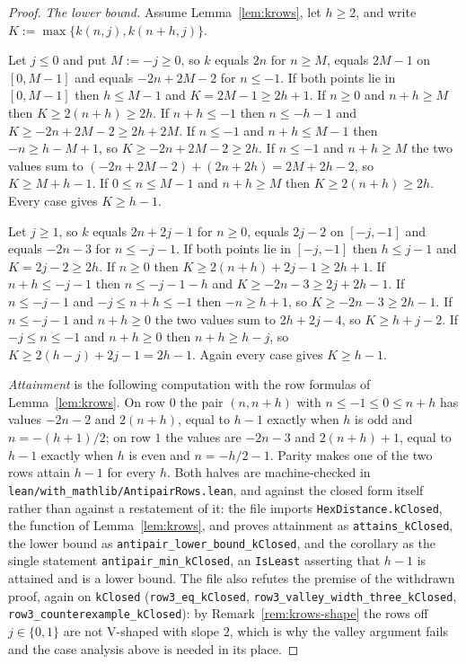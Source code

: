 \documentclass[11pt]{article}
\theoremstyle{definition}
\theoremstyle{remark}
\begin{document}
\begin{proof}
\emph{The lower bound.} Assume Lemma~\ref{lem:krows}, let $h\ge2$, and write
$K:=\max\{k(n,j),k(n+h,j)\}$.

Let $j\le0$ and put $M:=-j\ge0$, so $k$ equals $2n$ for $n\ge M$, equals $2M-1$ on $[0,M-1]$
and equals $-2n+2M-2$ for $n\le-1$. If both points lie in $[0,M-1]$ then $h\le M-1$ and
$K=2M-1\ge2h+1$. If $n\ge0$ and $n+h\ge M$ then $K\ge2(n+h)\ge2h$. If $n+h\le-1$ then
$n\le-h-1$ and $K\ge-2n+2M-2\ge2h+2M$. If $n\le-1$ and $n+h\le M-1$ then $-n\ge h-M+1$, so
$K\ge-2n+2M-2\ge2h$. If $n\le-1$ and $n+h\ge M$ the two values sum to
$(-2n+2M-2)+(2n+2h)=2M+2h-2$, so $K\ge M+h-1$. If $0\le n\le M-1$ and $n+h\ge M$ then
$K\ge2(n+h)\ge2h$. Every case gives $K\ge h-1$.

Let $j\ge1$, so $k$ equals $2n+2j-1$ for $n\ge0$, equals $2j-2$ on $[-j,-1]$ and equals
$-2n-3$ for $n\le-j-1$. If both points lie in $[-j,-1]$ then $h\le j-1$ and $K=2j-2\ge2h$. If
$n\ge0$ then $K\ge2(n+h)+2j-1\ge2h+1$. If $n+h\le-j-1$ then $n\le-j-1-h$ and
$K\ge-2n-3\ge2j+2h-1$. If $n\le-j-1$ and $-j\le n+h\le-1$ then $-n\ge h+1$, so
$K\ge-2n-3\ge2h-1$. If $n\le-j-1$ and $n+h\ge0$ the two values sum to $2h+2j-4$, so
$K\ge h+j-2$. If $-j\le n\le-1$ and $n+h\ge0$ then $n+h\ge h-j$, so $K\ge2(h-j)+2j-1=2h-1$.
Again every case gives $K\ge h-1$.

\emph{Attainment} is the following computation with the row formulas of
Lemma~\ref{lem:krows}. On row $0$ the pair $(n,n+h)$ with $n\le-1\le0\le n+h$ has
values $-2n-2$ and $2(n+h)$, equal to $h-1$ exactly when $h$ is odd and
$n=-(h+1)/2$; on row $1$ the values are $-2n-3$ and $2(n+h)+1$, equal to $h-1$
exactly when $h$ is even and $n=-h/2-1$. Parity makes one of the two rows
attain $h-1$ for every $h$. Both halves are machine-checked in
\texttt{lean/with\_mathlib/AntipairRows.lean}, and against the closed form
itself rather than against a restatement of it: the file imports
\texttt{HexDistance.kClosed}, the function of Lemma~\ref{lem:krows}, and proves
attainment as \texttt{attains\_kClosed}, the lower bound as
\texttt{antipair\_lower\_bound\_kClosed}, and the corollary as the single
statement \texttt{antipair\_min\_kClosed}, an \texttt{IsLeast} asserting that
$h-1$ is attained and is a lower bound. The file also refutes the premise of the
withdrawn proof, again on \texttt{kClosed}
(\texttt{row3\_eq\_kClosed}, \texttt{row3\_valley\_width\_three\_kClosed},
\texttt{row3\_counterexample\_kClosed}): by
Remark~\ref{rem:krows-shape} the rows off $j\in\{0,1\}$ are not V-shaped with slope $2$, which
is why the valley argument fails and the case analysis above is needed in its place.
\end{proof}
\end{document}
